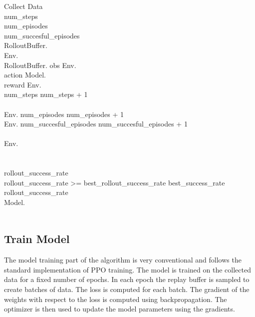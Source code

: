 \renewcommand{\thepseudonum}{\roman{pseudonum}}
\begin{pseudocode}{Collect Data}{ }
\\

num\_steps \\
num\_episodes \\
num\_succesful\_episodes \\

RolloutBuffer.\\
Env.\\
\WHILE RolloutBuffer. \DO
\BEGIN
obs \GETS Env.\\
action \GETS Model.\\
reward \GETS Env.\\
num\_steps \GETS num\_steps + 1\\
\\
\IF Env. \THEN
\BEGIN
num\_episodes \GETS num\_episodes + 1\\
\IF Env. \THEN
\BEGIN
num\_succesful\_episodes \GETS num\_succesful\_episodes + 1\\
\END\\
Env.\\
\END\\
\END\\

rollout\_success\_rate \GETS {}\\

\IF rollout\_success\_rate >= best\_rollout\_success\_rate \THEN
\BEGIN
best\_success\_rate \GETS rollout\_success\_rate\\
Model.\\
\END\\


\ENDPROCEDURE
\end{pseudocode}

\subsection{Train Model}

The model training part of the algorithm is very conventional and follows the standard implementation of PPO training. The model is trained on the collected data for a fixed number of epochs. In each epoch the replay buffer is sampled to create batches of data. The loss is computed for each batch. The gradient of the weights with respect to the loss is computed using backpropagation. The optimizer is then used to update the model parameters using the gradients.

